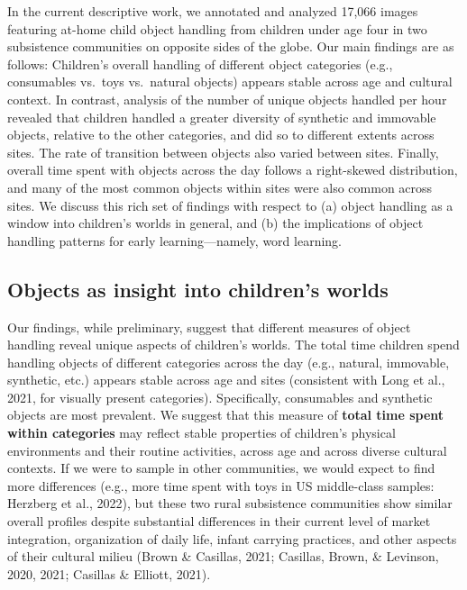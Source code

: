 \documentclass[10pt, letterpaper]{article}
\begin{document}
In the current descriptive work, we annotated and analyzed 17,066 images
featuring at-home child object handling from children under age four in
two subsistence communities on opposite sides of the globe. Our main
findings are as follows: Children's overall handling of different object
categories (e.g., consumables vs.~toys vs.~natural objects) appears
stable across age and cultural context. In contrast, analysis of the
number of unique objects handled per hour revealed that children handled
a greater diversity of synthetic and immovable objects, relative to the
other categories, and did so to different extents across sites. The rate
of transition between objects also varied between sites. Finally,
overall time spent with objects across the day follows a right-skewed
distribution, and many of the most common objects within sites were also
common across sites. We discuss this rich set of findings with respect
to (a) object handling as a window into children's worlds in general,
and (b) the implications of object handling patterns for early
learning---namely, word learning.

\hypertarget{objects-as-insight-into-childrens-worlds}{%
\subsection{Objects as insight into children's
worlds}\label{objects-as-insight-into-childrens-worlds}}

Our findings, while preliminary, suggest that different measures of
object handling reveal unique aspects of children's worlds. The total
time children spend handling objects of different categories across the
day (e.g., natural, immovable, synthetic, etc.) appears stable across
age and sites (consistent with Long et al., 2021, for visually present
categories). Specifically, consumables and synthetic objects are most
prevalent. We suggest that this measure of \textbf{total time spent
within categories} may reflect stable properties of children's physical
environments and their routine activities, across age and across diverse
cultural contexts. If we were to sample in other communities, we would
expect to find more differences (e.g., more time spent with toys in US
middle-class samples: Herzberg et al., 2022), but these two rural
subsistence communities show similar overall profiles despite
substantial differences in their current level of market integration,
organization of daily life, infant carrying practices, and other aspects
of their cultural milieu (Brown \& Casillas, 2021; Casillas, Brown, \&
Levinson, 2020, 2021; Casillas \& Elliott, 2021).
\end{document}
